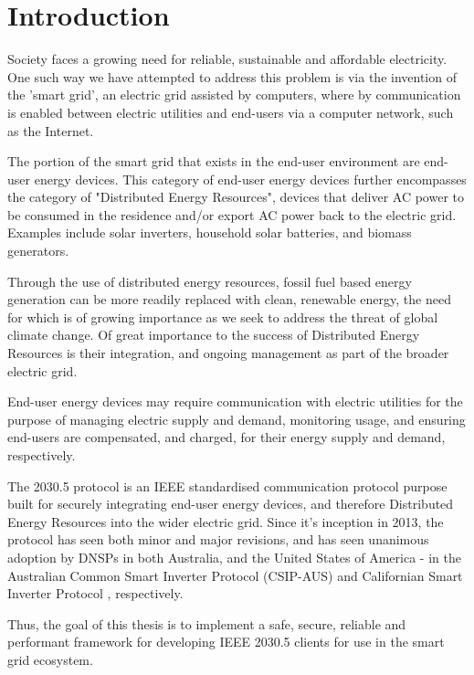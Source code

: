 \chapter{Introduction}\label{ch:intro}
Society faces a growing need for reliable, sustainable and affordable electricity. One such way we have attempted to address this problem is via the invention of the 'smart grid', an electric grid assisted by computers, where by communication is enabled between electric utilities and end-users via a computer network, such as the Internet.

The portion of the smart grid that exists in the end-user environment are end-user energy devices.
This category of end-user energy devices further encompasses the category of "Distributed Energy Resources", devices that deliver AC power to be consumed in the residence and/or export AC power back to the electric grid. Examples include solar inverters, household solar batteries, and biomass generators. \cite{IEEE2030.5}

Through the use of distributed energy resources, fossil fuel based energy generation can be more readily replaced with clean, renewable energy, the need for which is of growing importance as we seek to address the threat of global climate change. Of great importance to the success of Distributed Energy Resources is their integration, and ongoing management as part of the broader electric grid.

End-user energy devices may require communication with electric utilities for the purpose of managing electric supply and demand, monitoring usage, and ensuring end-users are compensated, and charged, for their energy supply and demand, respectively.

The 2030.5 protocol is an IEEE standardised communication protocol purpose built for securely integrating end-user energy devices, and therefore Distributed Energy Resources into the wider electric grid. Since it's inception in 2013, the protocol has seen both minor and major revisions, and has seen unanimous adoption by DNSPs in both Australia, and the United States of America - in the Australian Common Smart Inverter Protocol (CSIP-AUS) \cite{CSIPAus} and Californian Smart Inverter Protocol \cite{CalAdoption}, respectively.

Thus, the goal of this thesis is to implement a safe, secure, reliable and performant framework for developing IEEE 2030.5 clients for use in the smart grid ecosystem. 